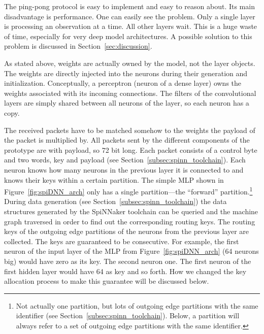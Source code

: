 \documentclass[]{article}
\begin{document}
The ping-pong protocol is easy to implement and easy to reason about.
Its main disadvantage is performance.
One can easily see the problem.
Only a single layer is processing an observation at a time.
All other layers wait.
This is a huge waste of time, especially for very deep model
architectures.
A possible solution to this problem is discussed in
Section~\ref{sec:discussion}.

As stated above, weights are actually owned by the model, not
the layer objects.
The weights are directly injected into the neurons during their
generation and initialization.
Conceptually, a perceptron (neuron of a dense layer) owns the weights
associated with its incoming connections.
The filters of the convolutional layers are simply shared between
all neurons of the layer, so each neuron has a copy.

The received packets have to be matched somehow to the weights
the payload of the packet is multiplied by.
All packets sent by the different components of the prototype are
with payload, so 72 bit long.
Each packet consists of a control byte and two words, key and payload
(see Section~\ref{subsec:spinn_toolchain}).
Each neuron knows how many neurons in the previous layer it is
connected to and knows their keys within a certain partition.
The simple MLP shown in Figure~\ref{fig:spiDNN_arch} only has a
single partition---the ``forward'' partition.\footnote{%
  Not actually one
  partition, but lots of outgoing edge partitions with the same
  identifier (see Section~\ref{subsec:spinn_toolchain}).
  Below, a partition will always refer to a set of outgoing edge
  partitions with the same identifier.}
During data generation (see Section~\ref{subsec:spinn_toolchain})
the data structures generated by the SpiNNaker toolchain can be
queried and the machine graph traversed in order to find out the
corresponding routing keys.
The routing keys of the outgoing edge partitions of the neurons
from the previous layer are collected.
The keys are guaranteed to be consecutive.
For example, the first neuron of the input layer of the MLP from
Figure~\ref{fig:spiDNN_arch} (64 neurons big) would have zero as its
key.
The second neuron one.
The first neuron of the first hidden layer would have 64 as key and so
forth.
How we changed the key allocation process to make this guarantee will
be discussed below.
\end{document}
